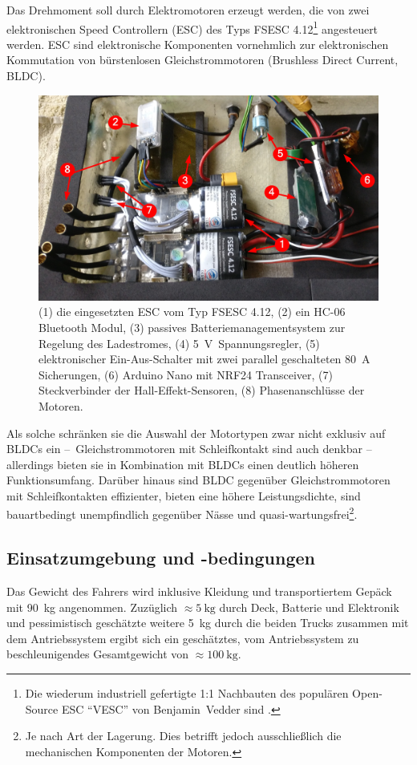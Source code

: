 			Das Drehmoment soll durch Elektromotoren erzeugt werden, die von zwei elektronischen Speed Controllern (ESC) des Typs \textsc{FSESC 4.12}\footnote{\hspace{1mm} Die wiederum industriell gefertigte 1:1 Nachbauten des populären Open-Source ESC ``\textsc{VESC}'' von Benjamin~Vedder sind \cites{vesc.project}{vedder.se}{vesc.documentation.2015}.} angesteuert werden.
			ESC sind elektronische Komponenten vornehmlich zur elektronischen Kommutation von bürstenlosen Gleichstrommotoren (Brushless Direct Current, BLDC).
			\begin{figure}[h]
				\centering
				\includegraphics[width=.9\textwidth]{Footage/Pictures/Electronics.jpg}
				\caption[Eingesetzte ESC]{(1) die eingesetzten ESC vom Typ \textsc{FSESC 4.12}, (2) ein HC-06 Bluetooth Modul, (3) passives Batteriemanagementsystem zur Regelung des Ladestromes, (4) \qty{5}{\volt}~Spannungsregler, (5) elektronischer Ein-Aus-Schalter mit zwei parallel geschalteten \qty{80}{\ampere} Sicherungen, (6) Arduino Nano mit NRF24 Transceiver, (7) Steckverbinder der Hall-Effekt-Sensoren, (8) Phasenanschlüsse der Motoren.}\label{fig:electronics}
			\end{figure}
			Als solche schränken sie die Auswahl der Motortypen zwar nicht exklusiv auf BLDCs ein --~Gleichstrommotoren mit Schleifkontakt sind auch denkbar -- allerdings bieten sie in Kombination mit BLDCs einen deutlich höheren Funktionsumfang.
			Darüber hinaus sind BLDC gegenüber Gleichstrommotoren mit Schleifkontakten effizienter, bieten eine höhere Leistungsdichte, sind bauartbedingt unempfindlich gegenüber Nässe und quasi-wartungsfrei\footnote{\hspace{1mm} Je nach Art der Lagerung. Dies betrifft jedoch ausschließlich die mechanischen Komponenten der Motoren.}.
		\subsection{Einsatzumgebung und -bedingungen}
			Das Gewicht des Fahrers wird inklusive Kleidung und transportiertem Gepäck mit \qty{90}{\kilo\gram} angenommen.
			Zuzüglich \(\approx \qty{5}{\kilo\gram}\) durch Deck, Batterie und Elektronik und pessimistisch geschätzte weitere \qty{5}{\kilo\gram} durch die beiden Trucks zusammen mit dem Antriebssystem ergibt sich ein geschätztes, vom Antriebssystem zu beschleunigendes Gesamtgewicht von \(\approx \qty{100}{\kilo\gram}\).

